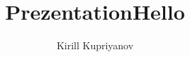\documentclass{beamer}
\author{Kirill Kupriyanov}
\title{Prezentation}
\begin{document}
\maketitle

\begin{frame}
    \title{Hello}
\end{frame}
\end{document}
